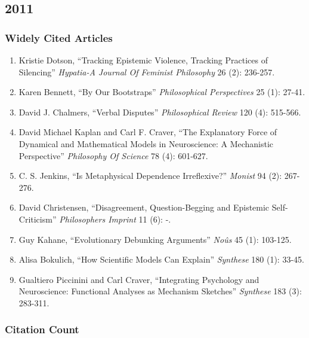 \documentclass[
  10pt,
  letterpaper,
  DIV=11,
  numbers=noendperiod,
  twoside]{scrartcl}
\providecommand{\tightlist}{%
  \setlength{\itemsep}{0pt}\setlength{\parskip}{0pt}}\usepackage{longtable,booktabs,array}
\begin{document}
\newpage

\subsection{2011}\label{section-35}

\subsubsection*{Widely Cited Articles}\label{widely-cited-articles-35}

\begin{enumerate}
\def\labelenumi{\arabic{enumi}.}
\tightlist
\item
  Kristie Dotson, ``Tracking Epistemic Violence, Tracking Practices of
  Silencing'' \emph{Hypatia-A Journal Of Feminist Philosophy} 26 (2):
  236-257.
\item
  Karen Bennett, ``By Our Bootstraps'' \emph{Philosophical Perspectives}
  25 (1): 27-41.
\item
  David J. Chalmers, ``Verbal Disputes'' \emph{Philosophical Review} 120
  (4): 515-566.
\item
  David Michael Kaplan and Carl F. Craver, ``The Explanatory Force of
  Dynamical and Mathematical Models in Neuroscience: A Mechanistic
  Perspective'' \emph{Philosophy Of Science} 78 (4): 601-627.
\item
  C. S. Jenkins, ``Is Metaphysical Dependence Irreflexive?''
  \emph{Monist} 94 (2): 267-276.
\item
  David Christensen, ``Disagreement, Question-Begging and Epistemic
  Self-Criticism'' \emph{Philosophers Imprint} 11 (6): -.
\item
  Guy Kahane, ``Evolutionary Debunking Arguments'' \emph{Noûs} 45 (1):
  103-125.
\item
  Alisa Bokulich, ``How Scientific Models Can Explain'' \emph{Synthese}
  180 (1): 33-45.
\item
  Gualtiero Piccinini and Carl Craver, ``Integrating Psychology and
  Neuroscience: Functional Analyses as Mechanism Sketches''
  \emph{Synthese} 183 (3): 283-311.
\end{enumerate}

\subsubsection*{Citation Count}\label{citation-count-35}
\end{document}

